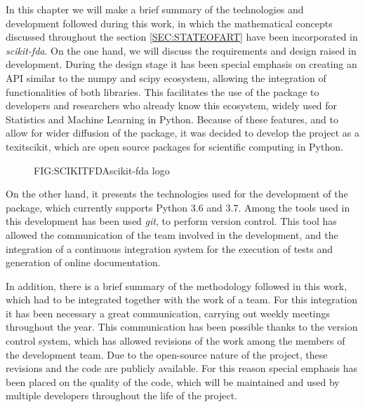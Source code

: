 
In this chapter we will make a brief summary of the technologies and development
followed during this work, in which the mathematical concepts discussed
throughout the section \ref{SEC:STATEOFART} have been incorporated in
\textit{scikit-fda}. On the one hand, we will discuss the requirements and
design raised in development. During the design stage it has been special
emphasis on creating an API similar to the numpy and scipy ecosystem, allowing
the integration of functionalities of both libraries. This facilitates the use
of the package to developers and researchers who already know this ecosystem,
widely used for Statistics and Machine Learning in Python. Because of these
features, and to allow for wider diffusion of the package, it was decided to
develop the project as a texit{scikit}, which are open source packages for
scientific computing in Python.

\begin{figure}[scikit-fda logo]{FIG:SCIKITFDA}{scikit-fda logo}
\end{figure}

On the other hand, it presents the technologies used for the development of
the package, which currently supports Python 3.6 and 3.7.
Among the tools used in this development has been used \textit{git},
to perform version control. This tool has allowed the communication of the team
involved in the development, and the integration of a continuous integration
system for the execution of tests and generation of online documentation.

In addition, there is a brief summary of the methodology followed in this work,
which had to be integrated together with the work of a team.
For this integration it has been necessary a great communication,
carrying out weekly meetings throughout the year. This communication has
been possible thanks to the version control system, which has allowed
revisions of the work among the members of the development team.
 Due to the open-source nature of the project, these revisions and the code
 are publicly available. For this reason special emphasis has been placed on
 the quality of the code, which will be maintained and used by multiple
 developers throughout the life of the project.
